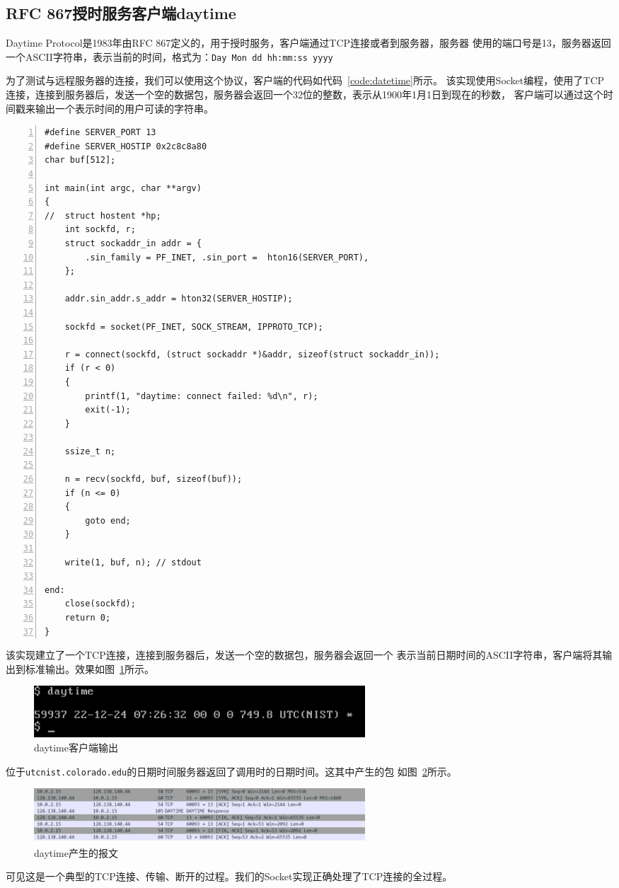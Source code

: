 \documentclass[a4paper,twoside]{ctexrep}
\begin{document}
\begin{spacing}{1.2}
\subsection{RFC 867授时服务客户端daytime}

Daytime Protocol是1983年由RFC 867定义的，用于授时服务，客户端通过TCP连接或者到服务器，服务器
使用的端口号是13，服务器返回一个ASCII字符串，表示当前的时间，格式为：\texttt{Day Mon dd hh:mm:ss yyyy}

为了测试与远程服务器的连接，我们可以使用这个协议，客户端的代码如代码~\ref{code:datetime}所示。
该实现使用Socket编程，使用了TCP连接，连接到服务器后，发送一个空的数据包，服务器会返回一个32位的整数，表示从1900年1月1日到现在的秒数，
客户端可以通过这个时间戳来输出一个表示时间的用户可读的字符串。

\begin{lstlisting}[numbers=left,style=CppStyle,caption={daytime客户端},label={code:datetime}]
#define SERVER_PORT 13
#define SERVER_HOSTIP 0x2c8c8a80
char buf[512];

int main(int argc, char **argv)
{
//	struct hostent *hp;
	int sockfd, r;
	struct sockaddr_in addr = {
		.sin_family = PF_INET, .sin_port =  hton16(SERVER_PORT),
	};

	addr.sin_addr.s_addr = hton32(SERVER_HOSTIP);

	sockfd = socket(PF_INET, SOCK_STREAM, IPPROTO_TCP);

	r = connect(sockfd, (struct sockaddr *)&addr, sizeof(struct sockaddr_in));
	if (r < 0)
	{
		printf(1, "daytime: connect failed: %d\n", r);
		exit(-1);
	}

	ssize_t n;

	n = recv(sockfd, buf, sizeof(buf));
	if (n <= 0)
	{
		goto end;
	}

	write(1, buf, n); // stdout

end:
	close(sockfd);
	return 0;
}
\end{lstlisting}

该实现建立了一个TCP连接，连接到服务器后，发送一个空的数据包，服务器会返回一个
表示当前日期时间的ASCII字符串，客户端将其输出到标准输出。效果如图~\ref{fig:daytime}所示。
\begin{figure}[htb]
	\centering
	\caption{daytime客户端输出}
	\label{fig:daytime}
	\includegraphics[width=0.6\textwidth]{daytime.png}
\end{figure}
位于\texttt{utcnist.colorado.edu}的日期时间服务器返回了调用时的日期时间。这其中产生的包
如图~\ref{fig:daytimepacket}所示。
\begin{figure}[htb]
	\centering
	\caption{daytime产生的报文}
	\label{fig:daytimepacket}
	\includegraphics[width=0.6\textwidth]{daytimepack.png}
\end{figure}
可见这是一个典型的TCP连接、传输、断开的过程。我们的Socket实现正确处理了TCP连接的全过程。


\end{spacing}
\end{document}
